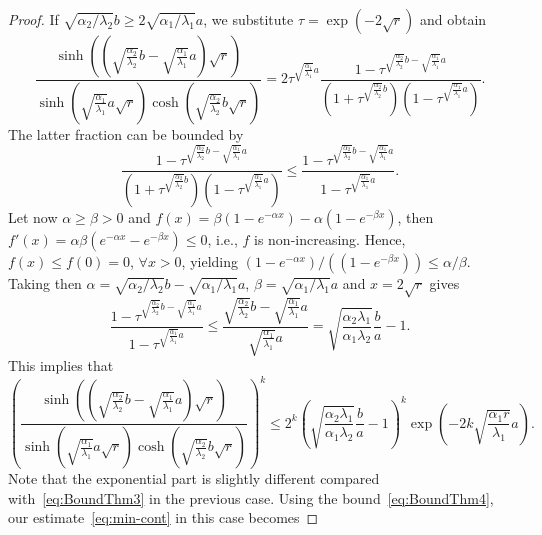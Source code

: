\documentclass[reqno]{amsart}
\begin{document}
\begin{proof}
If $\sqrt{\alpha_2/\lambda_2} b \geq 2\sqrt{\alpha_1/\lambda_1} a$, we substitute $\tau=\exp(-2\sqrt{r})$ and obtain 
\[\frac{\sinh\left(\left(\sqrt{\frac{\alpha_2}{\lambda_2}} b - \sqrt{\frac{\alpha_1}{\lambda_1}} a \right) \sqrt{r} \right)}{\sinh\left(\sqrt{\frac{\alpha_1}{\lambda_1}} a \sqrt{r}\right)\cosh\left(\sqrt{\frac{\alpha_2}{\lambda_2}} b \sqrt{r}\right)}
= 2 \tau^{\sqrt{\frac{\alpha_1}{\lambda_1}} a}\frac{1-\tau^{\sqrt{\frac{\alpha_2}{\lambda_2}} b-\sqrt{\frac{\alpha_1}{\lambda_1}} a}}{\left(1+\tau^{\sqrt{\frac{\alpha_2}{\lambda_2}} b}\right)\left(1-\tau^{\sqrt{\frac{\alpha_1}{\lambda_1}} a}\right)}.\] 
The latter fraction can be bounded by
\[\frac{1-\tau^{\sqrt{\frac{\alpha_2}{\lambda_2}} b-\sqrt{\frac{\alpha_1}{\lambda_1}} a}}{\left(1+\tau^{\sqrt{\frac{\alpha_2}{\lambda_2}} b}\right)\left(1-\tau^{\sqrt{\frac{\alpha_1}{\lambda_1}} a}\right)} 
\leq \frac{1-\tau^{\sqrt{\frac{\alpha_2}{\lambda_2}} b-\sqrt{\frac{\alpha_1}{\lambda_1}} a}}{1-\tau^{\sqrt{\frac{\alpha_1}{\lambda_1}} a}}.\] 
Let now $\alpha \geq \beta >0$ and $f(x) = \beta(1 - e^{-\alpha x}) - \alpha(1 - e^{-\beta x})$, then $f'(x) = \alpha\beta(e^{-\alpha x} - e^{-\beta x}) \leq 0$, i.e., $f$ is non-increasing. Hence, $f(x) \leq f(0) = 0$, $\forall x > 0$, yielding $(1 - e^{-\alpha x})/((1 - e^{-\beta x})) \leq \alpha/\beta$. Taking then $\alpha = \sqrt{\alpha_2/\lambda_2} b - \sqrt{\alpha_1/\lambda_1} a$, $\beta = \sqrt{\alpha_1/\lambda_1} a$ and $x = 2\sqrt{r}$ gives
\begin{equation}\label{eq:bound-exp}
	\frac{1-\tau^{\sqrt{\frac{\alpha_2}{\lambda_2}} b-\sqrt{\frac{\alpha_1}{\lambda_1}} a}}{1-\tau^{\sqrt{\frac{\alpha_1}{\lambda_1}} a}} 
	\leq \frac{\sqrt{\frac{\alpha_2}{\lambda_2}} b-\sqrt{\frac{\alpha_1}{\lambda_1}} a}{\sqrt{\frac{\alpha_1}{\lambda_1}} a} = \sqrt{\frac{\alpha_2 \lambda_1}{\alpha_1\lambda_2}}\frac{b}{a} - 1.
\end{equation} 
This implies that 
\begin{equation}\label{eq:BoundThm4}
\left(\frac{\sinh\left(\left(\sqrt{\frac{\alpha_2}{\lambda_2}} b - \sqrt{\frac{\alpha_1}{\lambda_1}} a \right) \sqrt{r} \right)}{\sinh\left(\sqrt{\frac{\alpha_1}{\lambda_1}} a \sqrt{r}\right)\cosh\left(\sqrt{\frac{\alpha_2}{\lambda_2}} b \sqrt{r}\right)}\right)^k
\leq 2^k \left(\sqrt{\frac{\alpha_2 \lambda_1}{\alpha_1\lambda_2}}\frac{b}{a} - 1\right)^k \exp\left(-2k\sqrt{\frac{\alpha_1r}{\lambda_1}} a\right).
\end{equation} 
Note that the exponential part is slightly different compared with~\eqref{eq:BoundThm3} in the previous case. Using the bound~\eqref{eq:BoundThm4}, our estimate~\eqref{eq:min-cont} in this case becomes

\end{proof}
\end{document}
